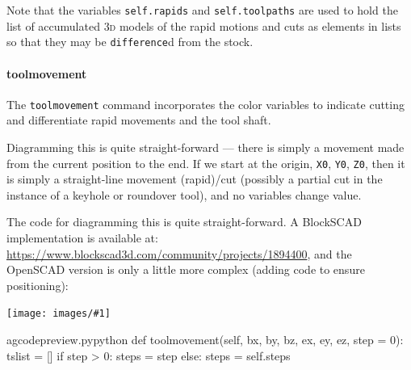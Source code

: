 \documentclass{ltxdoc}
\newcommand{\includeimage}[1]{\bigskip\noindent\texttt{[image: images/\#1]}\bigskip}
\begin{document}
Note that the variables \verb|self.rapids| and \verb|self.toolpaths| are used to hold the list of accumulated \textsc{3d} models of the rapid motions and cuts as elements in lists so that they may be \verb|difference|d from the stock.


\paragraph{toolmovement}

The \verb|toolmovement| command incorporates the color variables to indicate cutting and differentiate rapid movements and the tool shaft.

Diagramming this is quite straight-forward --- there is simply a movement made from the current position to the end. If we start at the origin, \verb|X0|, \verb|Y0|, \verb|Z0|, then it is simply a straight-line movement (rapid)/cut (possibly a partial cut in the instance of a keyhole or roundover tool), and no variables change value.

The code for diagramming this is quite straight-forward. A BlockSCAD implementation is available at: \url{https://www.blockscad3d.com/community/projects/1894400}, and the OpenSCAD version is only a little more complex (adding code to ensure positioning):

\includeimage{gcp_statemachine_0_0_0_50_25_-10.png}%


\lstset{firstnumber=\thegcpy}
\begin{writecode}{a}{gcodepreview.py}{python}
    def toolmovement(self, bx, by, bz, ex, ey, ez, step = 0):
        tslist = []
        if step > 0:
            steps = step
        else:
            steps = self.steps

\end{writecode}
\addtocounter{gcpy}{7}
\end{document}
